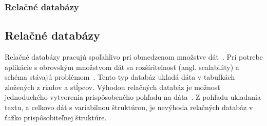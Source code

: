 %
%
{
	\subsubsection{Relačné databázy}
}
{
	\subsection{Relačné databázy}
}
\label{subsubsection:relation_dbs}
Relačné databázy pracujú spoľahlivo pri obmedzenom množstve dát~\cite{MongoDBvsMySQL2015}.
Pri potrebe aplikácie s obrovským množstvom dát sa rozšíriteľnosť (angl. scalability) a schéma stávajú problémom~\cite{NoSQLDBvsRealtionDB}.
Tento typ databáz ukladá dáta v tabuľkách zložených z riadov a stĺpcov.
Výhodou relačných databáz je možnosť jednoduchého vytvorenia prispôsobeného pohľadu na dáta~\cite{Maier}. Z pohľadu ukladania textu, a celkovo dát s variabilnou štruktúrou, je nevýhoda relačných databáz v ťažko prispôsobiteľnej štruktúre.

